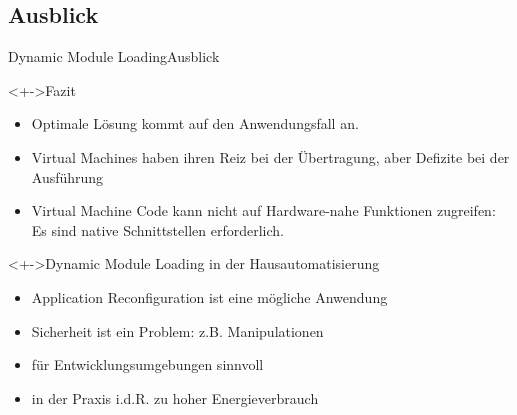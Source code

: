 \subsection{Ausblick}
\begin{frame}{Dynamic Module Loading}{Ausblick}
	\begin{alertblock}<+->{Fazit}
	\begin{itemize}
	\item 	Optimale Lösung kommt auf den Anwendungsfall an.
	\item 	Virtual Machines haben ihren Reiz bei der Übertragung, aber
			Defizite bei der Ausführung
	\item 	Virtual Machine Code kann nicht auf Hardware-nahe Funktionen
			zugreifen: Es sind native Schnittstellen erforderlich.
	\end{itemize}
	\end{alertblock}

	\begin{exampleblock}<+->{Dynamic Module Loading in der Hausautomatisierung}
		\begin{itemize}
		\item 	Application Reconfiguration ist eine mögliche Anwendung
		\item 	Sicherheit ist ein Problem: z.B. Manipulationen
		\item 	für Entwicklungsumgebungen sinnvoll
		\item 	in der Praxis i.d.R. zu hoher Energieverbrauch
		\end{itemize}
	\end{exampleblock}
\end{frame}

